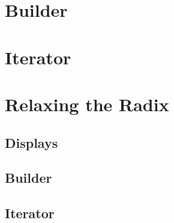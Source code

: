 
\section{Builder}




\section{Iterator}



\section{Relaxing the Radix}


\subsection{Displays}




\subsection{Builder}



\subsection{Iterator}

